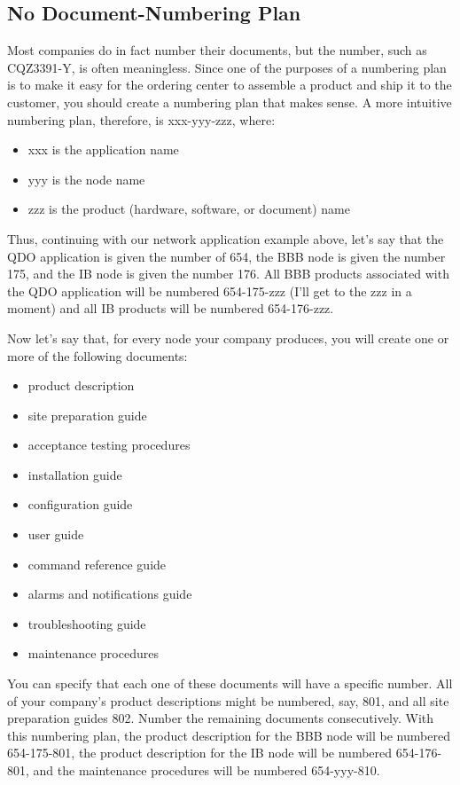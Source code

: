 \documentclass[12pt]{article}
\begin{document}
\subsection{No Document-Numbering Plan}
Most companies do in fact number their documents, but the number, such as CQZ3391-Y, is often meaningless. Since one of the purposes of a numbering plan is to make it easy for the ordering center to assemble a product and ship it to the customer, you should create a numbering plan that makes sense. A more intuitive numbering plan, therefore, is xxx-yyy-zzz, where:

\begin{itemize} \itemsep -2pt 
	\item[] xxx is the application name
	\item[] yyy is the node name
	\item[] zzz is the product (hardware, software, or document) name 
\end{itemize}

Thus, continuing with our network application example above, let's say that the QDO application is given the number of 654, the BBB node is given the number 175, and the IB node is given the number 176. All BBB products associated with the QDO application will be numbered 654-175-zzz (I'll get to the zzz in a moment) and all IB products will be numbered 654-176-zzz.

Now let's say that, for every node your company produces, you will create one or more of the following documents:

\begin{itemize} \itemsep -2pt
	\item product description
	\item site preparation guide
	\item acceptance testing procedures
	\item installation guide
	\item configuration guide
	\item user guide
	\item command reference guide
	\item alarms and notifications guide
	\item troubleshooting guide
	\item maintenance procedures
\end{itemize}

You can specify that each one of these documents will have a specific number. All of your company's product descriptions might be numbered, say, 801, and all site preparation guides 802. Number the remaining documents consecutively. With this numbering plan, the product description for the BBB node will be numbered 654-175-801, the product description for the IB node will be numbered 654-176-801, and the maintenance procedures will be numbered 654-yyy-810.
\end{document}

